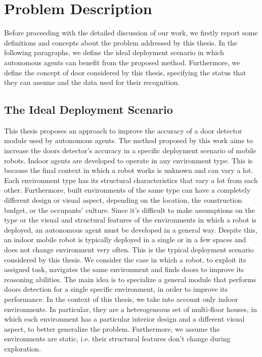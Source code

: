 \section{Problem Description}

Before proceeding with the detailed discussion of our work, we firstly report some definitions and concepts about the problem addressed by this thesis. In the following paragraphs, we define the ideal deployment scenario in which autonomous agents can benefit from the proposed method. Furthermore, we define the concept of door considered by this thesis, specifying the status that they can assume and the data used for their recognition.

\subsection{The Ideal Deployment Scenario}
\label{sec:deploymentscenario}
This thesis proposes an approach to improve the accuracy of a door detector module used by autonomous agents. The method proposed by this work aims to increase the doors detector's accuracy in a specific deployment scenario of mobile robots. Indoor agents are developed to operate in any environment type. This is because the final context in which a robot works is unknown and can vary a lot. Each environment type has its structural characteristics that vary a lot from each other. Furthermore, built environments of the same type can have a completely different design or visual aspect, depending on the location, the construction budget, or the occupants' culture. Since it's difficult to make assumptions on the type or the visual and structural features of the environments in which a robot is deployed, an autonomous agent must be developed in a general way. Despite this, an indoor mobile robot is typically deployed in a single or in a few spaces and does not change environment very often. This is the typical deployment scenario considered by this thesis. We consider the case in which a robot, to exploit its assigned task, navigates the same environment and finds doors to improve its reasoning abilities. The main idea is to specialize a general module that performs doors detection for a single specific environment, in order to improve its performance. In the context of this thesis, we take into account only indoor environments. In particular, they are a heterogeneous set of multi-floor houses, in which each environment has a particular interior design and a different visual aspect, to better generalize the problem. Furthermore, we assume the environments are static, i.e. their structural features don't change during exploration.

